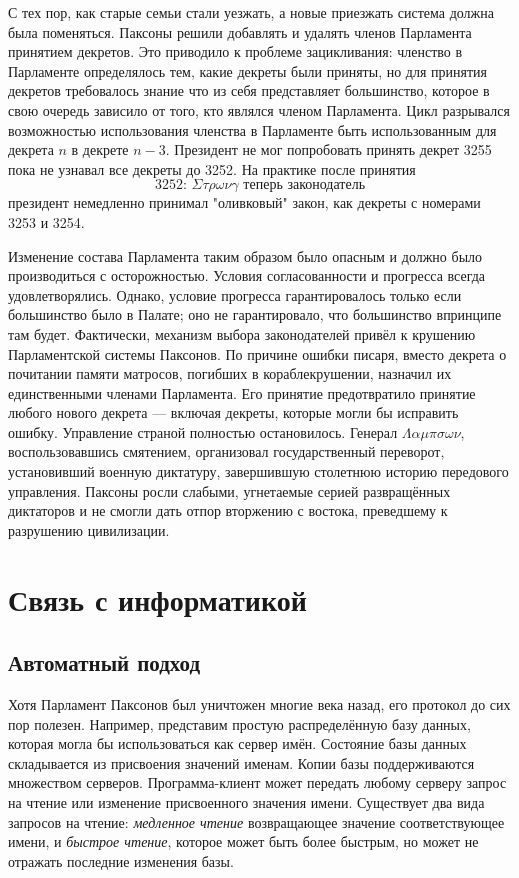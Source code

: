 \documentclass[12pt, a4paper]{article} %
\begin{document}
С тех пор, как старые семьи стали уезжать, а новые приезжать система должна была поменяться. Паксоны решили добавлять и удалять членов Парламента принятием декретов. Это приводило к проблеме зацикливания: членство в Парламенте определялось тем, какие декреты были приняты, но для принятия декретов требовалось знание что из себя представляет большинство, которое в свою очередь зависило от того, кто являлся членом Парламента. Цикл разрывался возможностью использования членства в Парламенте быть использованным для декрета $n$ в декрете $n-3$. Президент не мог попробовать принять декрет 3255 пока не узнавал все декреты до 3252. На практике после принятия 
\[
    \mbox{3252: $\Sigma\tau\rho\omega\nu\gamma$ теперь законодатель}
\]
президент немедленно принимал "оливковый" закон, как декреты с номерами 3253 и 3254.

Изменение состава Парламента таким образом было опасным и должно было производиться с осторожностью. Условия согласованности и прогресса всегда удовлетворялись. Однако, условие прогресса гарантировалось только если большинство было в Палате; оно не гарантировало, что большинство впринципе там будет. Фактически, механизм выбора законодателей привёл к крушению Парламентской системы Паксонов. По причине ошибки писаря, вместо декрета о почитании памяти матросов, погибших в кораблекрушении, назначил их единственными членами Парламента. Его принятие предотвратило принятие любого нового декрета --- включая декреты, которые могли бы исправить ошибку. Управление страной полностью остановилось. Генерал $\Lambda\alpha\mu\pi\sigma\omega\nu$, воспользовавшись смятением, организовал государственный переворот, установивший военную диктатуру, завершившую столетнюю историю передового управления. Паксоны росли слабыми, угнетаемые серией развращённых диктаторов и не смогли дать отпор вторжению с востока, преведшему к разрушению цивилизации.

\section{Связь с информатикой}

\subsection{Автоматный подход}

Хотя Парламент Паксонов был уничтожен многие века назад, его протокол до сих пор полезен. Например, представим простую распределённую базу данных, которая могла бы использоваться как сервер имён. Состояние базы данных складывается из присвоения значений именам. Копии базы поддерживаются множеством серверов. Программа-клиент может передать любому серверу запрос на чтение или изменение присвоенного значения имени. Существует два вида запросов на чтение: \textit{медленное чтение} возвращающее значение соответствующее имени, и \textit{быстрое чтение}, которое может быть более быстрым, но может не отражать последние изменения базы.
\end{document}
